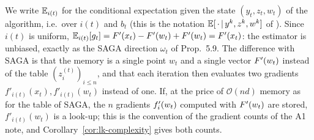 \begin{remark}
We write $\mathbb{E}_{i(t)}$ for the conditional expectation given the state $(y_t,z_t,w_t)$ of the algorithm, i.e.\ over $i(t)$ and $b_t$ (this is the notation $\mathbb{E}[\,\cdot\,|\,y^k,z^k,w^k]$ of \cite{kovalev2020dont}). Since $i(t)$ is uniform, $\mathbb{E}_{i(t)}[g_t]=F'(x_t)-F'(w_t)+F'(w_t)=F'(x_t)$: the estimator is unbiased, exactly as the SAGA direction $\omega_t$ of Prop.~5.9. The difference with SAGA is that the memory is a single point $w_t$ and a single vector $F'(w_t)$ instead of the table $(z_i^{(t)})_{i\le n}$, and that each iteration then evaluates two gradients $f'_{i(t)}(x_t),f'_{i(t)}(w_t)$ instead of one. If, at the price of $\mathcal O(nd)$ memory as for the table of SAGA, the $n$ gradients $f'_i(w_t)$ computed with $F'(w_t)$ are stored, $f'_{i(t)}(w_t)$ is a look-up; this is the convention of the gradient counts of the A1 note, and Corollary~\ref{cor:lk-complexity} gives both counts.
\end{remark}

